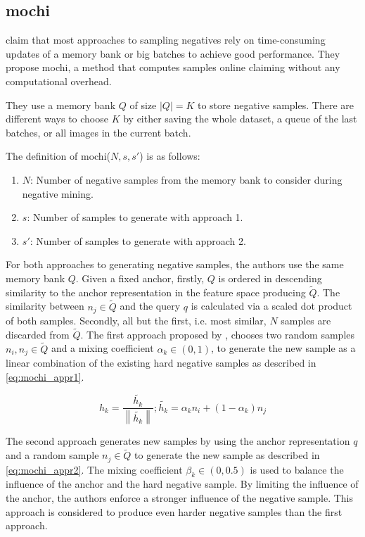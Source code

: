 \subsection{\acl{mochi}}\label{subsec:MoCHi}

\citet{mochi_2020} claim that most approaches to sampling negatives rely on 
time-consuming updates of a memory bank or big batches to achieve good performance.
They propose \ac{mochi}, a method that computes samples online claiming without any computational overhead.

They use a memory bank $Q$ of size $| Q | = K$ to store negative samples.
There are different ways to choose $K$ by either saving the whole dataset, a queue of the last batches,
or all images in the current batch.

The definition of \ac{mochi}($N, s, s'$) is as follows:
\begin{enumerate}
    \item $N$: Number of negative samples from the memory bank to consider during negative mining.
    \item $s$: Number of samples to generate with approach 1.
    \item $s'$: Number of samples to generate with approach 2.
\end{enumerate}
For both approaches to generating negative samples, the authors use the same memory bank $Q$.
Given a fixed anchor, firstly, $Q$ is ordered in descending similarity to the anchor representation    
in the feature space producing $\tilde{Q}$.
The similarity between $n_j \in \tilde{Q}$ and the query $q$ is calculated via 
a scaled dot product of both samples.
Secondly, all but the first, i.e. most similar, $N$ samples are discarded from $\tilde{Q}$.
The first approach proposed by \citeauthor{mochi_2020}, chooses two random samples $n_i, n_j \in \tilde{Q}$ 
and a mixing coefficient $\alpha_k \in (0,1)$, 
to generate the new sample as a linear combination of the existing hard negative samples 
as described in \eqref{eq:mochi_appr1}.

\begin{equation}
    h_k = \frac{\tilde{h_k}}{\left\| \tilde{h_k}  \right\|}; \tilde{h_k} = \alpha_k n_i + (1-\alpha_k)n_j
    \label{eq:mochi_appr1}
\end{equation}

The second approach generates new samples by using the anchor representation $q$ 
and a random sample $n_j \in \tilde{Q}$ to generate the new sample as described in \eqref{eq:mochi_appr2}.
The mixing coefficient $\beta_k \in (0,0.5)$ is used to balance the influence of the anchor 
and the hard negative sample.
By limiting the influence of the anchor, the authors enforce a stronger influence of the negative sample.
This approach is considered to produce even harder negative samples than the first approach.

